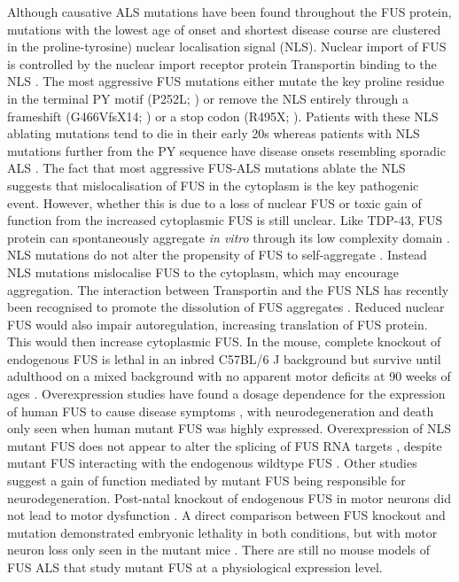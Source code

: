 Although causative ALS mutations have been found throughout the FUS protein, mutations with the lowest age of onset and shortest disease course are clustered in the proline-tyrosine) nuclear localisation signal (NLS). 
Nuclear import of FUS is controlled by the nuclear import receptor protein Transportin binding to the NLS \citep{Dormann2010}.
The most aggressive FUS mutations either mutate the key proline residue in the terminal PY motif (P252L; \citep{Chio2009}) or remove the NLS entirely through a frameshift (G466VfsX14; \citep{DeJesus-Hernandez2010}) or a stop codon (R495X; \citep{Bosco2010}). 
Patients with these NLS ablating mutations tend to die in their early 20s whereas patients with NLS mutations further from the PY sequence have disease onsets resembling sporadic ALS \citep{Shang2016}.
The fact that most aggressive FUS-ALS mutations ablate the NLS suggests that mislocalisation of FUS in the cytoplasm is the key pathogenic event. However, whether this is due to a loss of nuclear FUS or toxic gain of function from the increased cytoplasmic FUS is still unclear.
Like TDP-43, FUS protein can spontaneously aggregate \textit{in vitro} through its low complexity domain \citep{Murray2017}. 
NLS mutations do not alter the propensity of FUS to self-aggregate \citep{Sun2011}.
Instead NLS mutations mislocalise FUS to the cytoplasm, which may encourage aggregation. The interaction between Transportin and the FUS NLS has recently been recognised to promote the dissolution of FUS aggregates \citep{Guo2018, Yoshizawa2018}. 
Reduced nuclear FUS would also impair autoregulation, increasing translation of FUS protein. This would then increase cytoplasmic FUS.
In the mouse, complete knockout of endogenous FUS is lethal in an inbred C57BL/6 J background  \citep{Hicks2000, Kuroda2000} but survive until adulthood on a mixed background with no apparent motor deficits at 90 weeks of ages \citep{Kino2015}.
Overexpression studies have found a dosage dependence for the expression of human FUS to cause disease symptoms \citep{Verbeeck2012,Mitchell2013, Shiihashi2016}, with neurodegeneration and death only seen when human mutant FUS was highly expressed.
Overexpression of NLS mutant FUS does not appear to alter the splicing of FUS RNA targets \citep{Shiihashi2016}, despite mutant FUS interacting with the endogenous wildtype FUS \citep{Qiu2014}.
Other studies suggest a gain of function mediated by mutant FUS being responsible for neurodegeneration. 
Post-natal knockout of endogenous FUS  in motor neurons did not lead to motor dysfunction \citep{Sharma2016}.
A direct comparison between FUS knockout and mutation demonstrated embryonic lethality in both conditions, but with motor neuron loss only seen in the mutant mice \citep{Scekic-zahirovic2016}.  
There are still no mouse models of FUS ALS that study mutant FUS at a physiological expression level.




